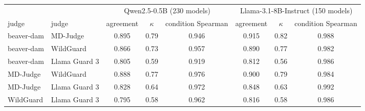 \begin{tabular}{llcccccc}
\toprule
 & & \multicolumn{3}{c}{Qwen2.5-0.5B (230 models)} & \multicolumn{3}{c}{Llama-3.1-8B-Instruct (150 models)} \\
\cmidrule(lr){3-5}\cmidrule(lr){6-8}
judge & judge & agreement & $\kappa$ & condition Spearman & agreement & $\kappa$ & condition Spearman \\
\midrule
beaver-dam & MD-Judge & 0.895 & 0.79 & 0.946 & 0.915 & 0.82 & 0.988 \\
beaver-dam & WildGuard & 0.866 & 0.73 & 0.957 & 0.890 & 0.77 & 0.982 \\
beaver-dam & Llama Guard 3 & 0.805 & 0.59 & 0.919 & 0.812 & 0.56 & 0.986 \\
MD-Judge & WildGuard & 0.888 & 0.77 & 0.976 & 0.900 & 0.79 & 0.984 \\
MD-Judge & Llama Guard 3 & 0.828 & 0.64 & 0.972 & 0.848 & 0.63 & 0.992 \\
WildGuard & Llama Guard 3 & 0.795 & 0.58 & 0.962 & 0.816 & 0.58 & 0.986 \\
\bottomrule
\end{tabular}
